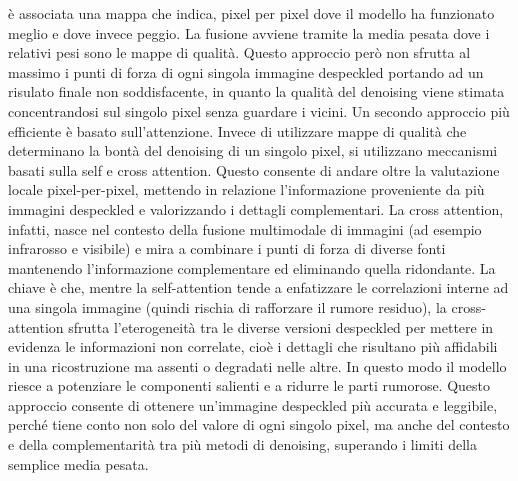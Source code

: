 è associata una mappa che indica, pixel per pixel dove il modello ha funzionato meglio e 
dove invece peggio. La fusione avviene tramite la media pesata dove i relativi pesi 
sono le mappe di qualità. Questo approccio però non sfrutta al massimo i punti di forza 
di ogni singola immagine despeckled portando ad un risulato finale non soddisfacente, 
in quanto la qualità del denoising viene stimata concentrandosi sul singolo pixel senza 
guardare i vicini. Un secondo approccio più efficiente è basato sull’attenzione. Invece 
di utilizzare mappe di qualità che determinano la bontà del denoising di un singolo 
pixel, si utilizzano meccanismi basati sulla self e cross attention. Questo consente di andare oltre 
la valutazione locale pixel-per-pixel, mettendo in relazione l’informazione proveniente 
da più immagini despeckled e valorizzando i dettagli complementari.
La cross attention, infatti, nasce nel contesto della fusione multimodale di immagini 
(ad esempio infrarosso e visibile) e mira a combinare i punti di forza di diverse fonti 
mantenendo l’informazione complementare ed eliminando quella ridondante.
La chiave è che, mentre la self-attention tende a enfatizzare le correlazioni interne ad 
una singola immagine (quindi rischia di rafforzare il rumore residuo), la cross-attention 
sfrutta l’eterogeneità tra le diverse versioni despeckled per mettere in evidenza le 
informazioni non correlate, cioè i dettagli che risultano più affidabili in una ricostruzione 
ma assenti o degradati nelle altre. In questo modo il modello riesce a potenziare le componenti 
salienti e a ridurre le parti rumorose. Questo approccio consente di ottenere un’immagine despeckled più accurata e leggibile, perché 
tiene conto non solo del valore di ogni singolo pixel, ma anche del contesto e della complementarità 
tra più metodi di denoising, superando i limiti della semplice media pesata.

\medskip

